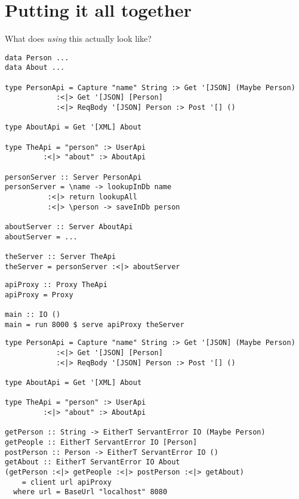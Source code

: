 \documentclass{beamer}
\makeatletter
\newcommand{\verbatimfont}[1]{\renewcommand{\verbatim@font}{\ttfamily#1}}
\makeatother
\begin{document}
\section{Putting it all together} %

\begin{frame}
What does \textit{using} this actually look like?
\end{frame}

\verbatimfont{\footnotesize}%
\begin{frame}[fragile]
\begin{verbatim}
data Person ...
data About ...

type PersonApi = Capture "name" String :> Get '[JSON] (Maybe Person)
            :<|> Get '[JSON] [Person]
            :<|> ReqBody '[JSON] Person :> Post '[] ()

type AboutApi = Get '[XML] About

type TheApi = "person" :> UserApi
         :<|> "about" :> AboutApi

personServer :: Server PersonApi
personServer = \name -> lookupInDb name
          :<|> return lookupAll
          :<|> \person -> saveInDb person

aboutServer :: Server AboutApi
aboutServer = ...

theServer :: Server TheApi
theServer = personServer :<|> aboutServer
\end{verbatim}

\end{frame}

\begin{frame}[fragile]

\begin{verbatim}
apiProxy :: Proxy TheApi
apiProxy = Proxy

main :: IO ()
main = run 8000 $ serve apiProxy theServer
\end{verbatim}

\end{frame}

\begin{frame}[fragile]

\begin{verbatim}
type PersonApi = Capture "name" String :> Get '[JSON] (Maybe Person)
            :<|> Get '[JSON] [Person]
            :<|> ReqBody '[JSON] Person :> Post '[] ()

type AboutApi = Get '[XML] About

type TheApi = "person" :> UserApi
         :<|> "about" :> AboutApi

getPerson :: String -> EitherT ServantError IO (Maybe Person)
getPeople :: EitherT ServantError IO [Person]
postPerson :: Person -> EitherT ServantError IO ()
getAbout :: EitherT ServantError IO About
(getPerson :<|> getPeople :<|> postPerson :<|> getAbout)
    = client url apiProxy
  where url = BaseUrl "localhost" 8080
\end{verbatim}

\end{frame}
\end{document}
